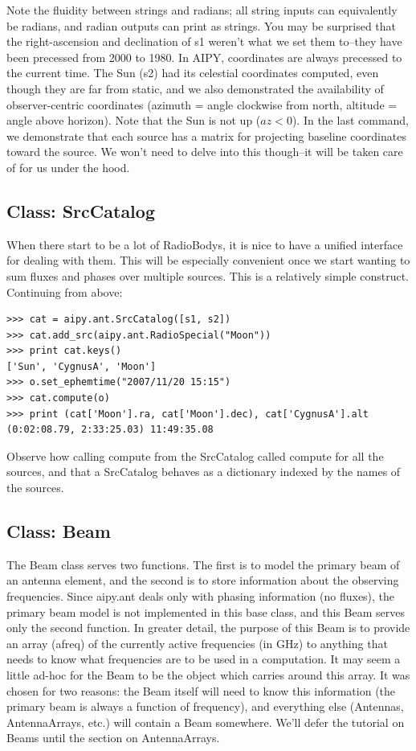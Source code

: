 Note the fluidity between strings and radians; all string inputs can
equivalently be radians, and radian outputs can print as strings.  You may
be surprised that the right-ascension and declination of s1 weren't what
we set them to--they have been precessed from 2000 to 1980.  In AIPY, 
coordinates are always precessed to the current time.  The Sun (s2) had its 
celestial coordinates computed, even though they are far from static, and
we also demonstrated the availability of observer-centric coordinates
(azimuth = angle clockwise from north, altitude = angle above horizon).
Note that the Sun is not up ($az<0$).  In the last command, we demonstrate that
each source has a matrix for projecting baseline coordinates toward
the source.  We won't need to delve into this though--it will be taken care
of for us under the hood.

\subsection{Class: SrcCatalog}

When there start to be a lot of RadioBodys, it is nice to have a unified
interface for dealing with them.  This will be especially convenient once
we start wanting to sum fluxes and phases over multiple sources.  This
is a relatively simple construct.  Continuing from above:

\begin{verbatim}
>>> cat = aipy.ant.SrcCatalog([s1, s2])
>>> cat.add_src(aipy.ant.RadioSpecial("Moon"))
>>> print cat.keys()
['Sun', 'CygnusA', 'Moon']
>>> o.set_ephemtime("2007/11/20 15:15")
>>> cat.compute(o)
>>> print (cat['Moon'].ra, cat['Moon'].dec), cat['CygnusA'].alt
(0:02:08.79, 2:33:25.03) 11:49:35.08
\end{verbatim}

Observe how calling compute from the SrcCatalog called compute for all
the sources, and that a SrcCatalog behaves as a dictionary indexed by
the names of the sources.

\subsection{Class: Beam}

The Beam class serves two functions.  The first is to model the primary
beam of an antenna element, and the second is to store information about the
observing frequencies.  Since aipy.ant deals only with phasing information
(no fluxes), the primary beam model is not implemented in this base class,
and this Beam serves only the second function.  In greater detail, the
purpose of this Beam is to provide an array (afreq) of the currently
active frequencies (in GHz) to anything that needs to know what frequencies
are to be used in a computation.  It may seem a little ad-hoc for the Beam to 
be the object which carries around this array.  It was chosen for two
reasons: the Beam itself will need to know this information (the primary
beam is always a function of frequency), and everything else (Antennas,
AntennaArrays, etc.) will contain a Beam somewhere.  We'll defer the
tutorial on Beams until the section on AntennaArrays.

